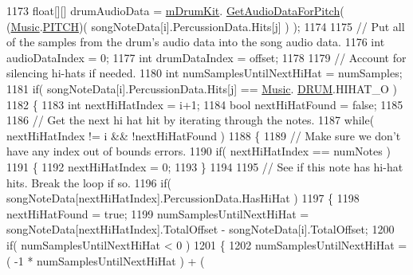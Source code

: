 \begin{DoxyCode}
1173                     \textcolor{keywordtype}{float}[][] drumAudioData = \hyperlink{group___v_i_m_priv_ga0bc7c9f776b0d2dae0ccb1f1ee5f2143}{mDrumKit}.
      \hyperlink{group___v_i_base_pub_func_gaf715f7c3bbd2f1a2fa543b2f0684f8a6}{GetAudioDataForPitch}( (\hyperlink{class_music}{Music}.\hyperlink{group___music_enums_ga508f69b199ea518f935486c990edac1d}{PITCH})( songNoteData[i].PercussionData.Hits[j] )
       );
1174 
1175                     \textcolor{comment}{// Put all of the samples from the drum's audio data into the song audio data.}
1176                     \textcolor{keywordtype}{int} audioDataIndex = 0;
1177                     \textcolor{keywordtype}{int} drumDataIndex = offset;
1178 
1179                     \textcolor{comment}{// Account for silencing hi-hats if needed.}
1180                     \textcolor{keywordtype}{int} numSamplesUntilNextHiHat = numSamples;
1181                     \textcolor{keywordflow}{if}( songNoteData[i].PercussionData.Hits[j] == \hyperlink{class_music}{Music}.
      \hyperlink{group___music_enums_gade475b4382c7066d1af13e7c13c029b6}{DRUM}.HIHAT\_O )
1182                     \{
1183                         \textcolor{keywordtype}{int} nextHiHatIndex = i+1;
1184                         \textcolor{keywordtype}{bool} nextHiHatFound = \textcolor{keyword}{false};
1185 
1186                         \textcolor{comment}{// Get the next hi hat hit by iterating through the notes.}
1187                         \textcolor{keywordflow}{while}( nextHiHatIndex != i && !nextHiHatFound )
1188                         \{
1189                             \textcolor{comment}{// Make sure we don't have any index out of bounds errors.}
1190                             \textcolor{keywordflow}{if}( nextHiHatIndex == numNotes )
1191                             \{
1192                                 nextHiHatIndex = 0;
1193                             \}
1194 
1195                             \textcolor{comment}{// See if this note has hi-hat hits. Break the loop if so.}
1196                             \textcolor{keywordflow}{if}( songNoteData[nextHiHatIndex].PercussionData.HasHiHat )
1197                             \{
1198                                 nextHiHatFound = \textcolor{keyword}{true};
1199                                 numSamplesUntilNextHiHat = songNoteData[nextHiHatIndex].TotalOffset - 
      songNoteData[i].TotalOffset;
1200                                 \textcolor{keywordflow}{if}( numSamplesUntilNextHiHat < 0 )
1201                                 \{
1202                                     numSamplesUntilNextHiHat = ( -1 * numSamplesUntilNextHiHat ) + ( 

\end{DoxyCode}
